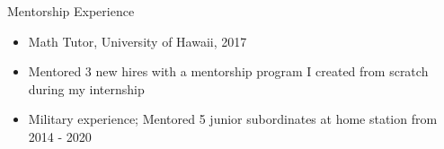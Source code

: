 \documentclass[]{mcdowellcv}
\begin{document}
	\begin{cvsection}{Mentorship Experience}
		\begin{cvsubsection}{}{}{}	
			\begin{itemize}
				\item Math Tutor, University of Hawaii, 2017
				\item Mentored 3 new hires with a mentorship program I created from scratch during my internship
				\item Military experience; Mentored 5 junior subordinates at home station from 2014 - 2020
			\end{itemize}
		\end{cvsubsection}
	\end{cvsection}

	
\end{document}
